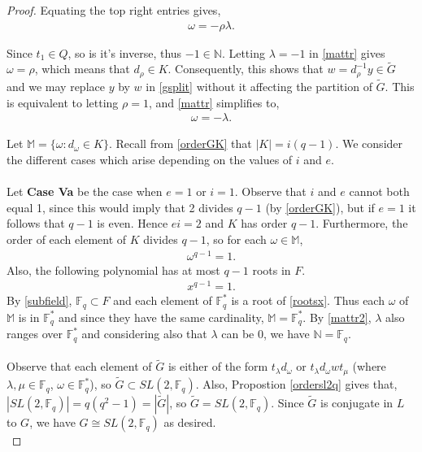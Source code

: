\begin{proof}
Equating the top right entries gives,
\begin{align}\label{mattr} \omega = -\rho \lambda.
\end{align}

Since $t_1 \in Q$, so is it's inverse, thus $-1 \in \mathbb{N}$. Letting $\lambda = -1$ in \eqref{mattr} gives $\omega = \rho$, which means that $d_\rho \in K$. Consequently, this shows that $w = d_\rho^{-1} y \in {\widetilde{G}}$ and we may replace $y$ by $w$ in \eqref{gsplit} without it affecting the partition of ${\widetilde{G}}$. This is equivalent to letting $\rho = 1$, and \eqref{mattr} simplifies to,
\begin{align}\label{mattr2} \omega = -\lambda.
\end{align}

Let $\mathbb{M} = \{ \omega : d_\omega \in K \}$. Recall from \eqref{orderGK} that $|K| = i(q-1)$. We consider the different cases which arise depending on the values of $i$ and $e$. \\
\\
Let \textbf{Case Va} be the case when $e=1$ or $i = 1$. Observe that $i$ and $e$ cannot both equal 1, since this would imply that 2 divides $q-1$ (by \eqref{orderGK}), but if $e=1$ it follows that $q-1$ is even. Hence $ei = 2$ and $K$ has order $q-1$. Furthermore, the order of each element of $K$ divides $q-1$, so for each $\omega \in \mathbb{M}$,
\begin{align}\label{roots} \omega^{q-1} = 1.
\end{align}
Also, the following polynomial has at most $q-1$ roots in $F$.
\begin{align}\label{rootsx} x^{q-1} = 1.
\end{align}
By \eqref{subfield}, $\mathbb{F}_q \subset F$ and each element of $\mathbb{F}^*_q$ is a root of \eqref{rootsx}. Thus each $\omega$ of $\mathbb{M}$ is in $\mathbb{F}^*_q$ and since they have the same cardinality, $\mathbb{M} = \mathbb{F}^*_q$. By \eqref{mattr2}, $\lambda$ also ranges over $\mathbb{F}^*_q$ and considering also that $\lambda$ can be 0, we have $\mathbb{N} =\mathbb{F}_q$. \\
\\
Observe that each element of ${\widetilde{G}}$ is either of the form $t_\lambda d_\omega$ or $t_\lambda d_\omega w t_\mu$ (where $\lambda, \mu \in \mathbb{F}_q$, $\omega \in \mathbb{F}^*_q$), so ${\widetilde{G}} \subset SL(2,\mathbb{F}_q)$. Also, Propostion \ref{ordersl2q} gives that, $|SL(2,\mathbb{F}_q)| = q(q^2-1) = |{\widetilde{G}}|$, so ${\widetilde{G}} = SL(2,\mathbb{F}_q)$. Since ${\widetilde{G}}$ is conjugate in $L$ to $G$, we have $G \cong SL(2,\mathbb{F}_q)$  as desired. \\

\end{proof}
